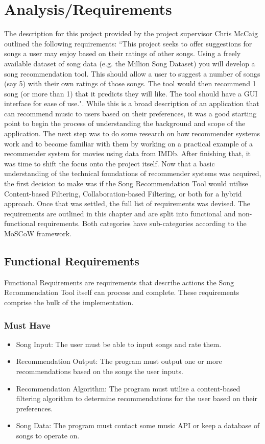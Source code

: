 \documentclass{l4proj}
\begin{document}
\chapter{Analysis/Requirements}
The description for this project provided by the project supervisor Chris McCaig outlined the following requirements: ``This project seeks to offer suggestions for songs a user may enjoy based on their ratings of other songs. Using a freely available dataset of song data (e.g. the Million Song Dataset) you will develop a song recommendation tool. This should allow a user to suggest a number of songs (say 5) with their own ratings of those songs. The tool would then recommend 1 song (or more than 1) that it predicts they will like. The tool should have a GUI interface for ease of use.". While this is a broad description of an application that can recommend music to users based on their preferences, it was a good starting point to begin the process of understanding the background and scope of the application. The next step was to do some research on how recommender systems work and to become familiar with them by working on a practical example of a recommender system for movies using data from IMDb. After finishing that, it was time to shift the focus onto the project itself. Now that a basic understanding of the technical foundations of recommender systems was acquired, the first decision to make was if the Song Recommendation Tool would utilise Content-based Filtering, Collaboration-based Filtering, or both for a hybrid approach. Once that was settled, the full list of requirements was devised. The requirements are outlined in this chapter and are split into functional and non-functional requirements. Both categories have sub-categories according to the MoSCoW framework.
\section{Functional Requirements}
Functional Requirements are requirements that describe actions the Song Recommendation Tool itself can process and complete. These requirements comprise the bulk of the implementation.
\subsection{Must Have}
\begin{itemize}
    \item Song Input: The user must be able to input songs and rate them.
    \item Recommendation Output: The program must output one or more recommendations based on the songs the user inputs.
    \item Recommendation Algorithm: The program must utilise a content-based filtering algorithm to determine recommendations for the user based on their preferences.
    \item Song Data: The program must contact some music API or keep a database of songs to operate on.
\end{itemize}
\end{document}
